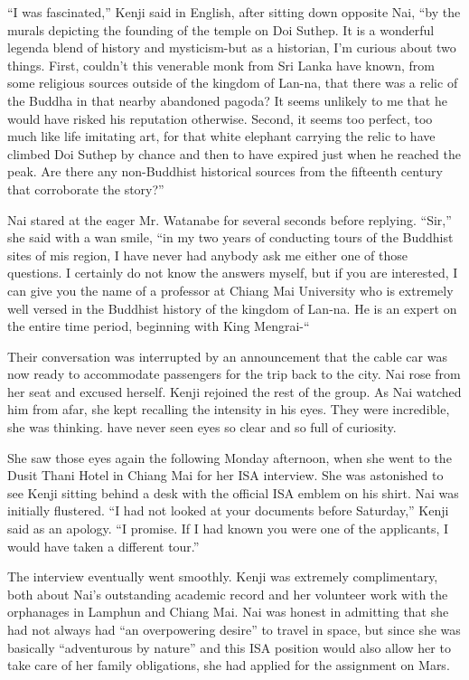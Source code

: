 \documentclass[]{article}
\begin{document}
{“I was fascinated,” Kenji said in English, after sitting down opposite Nai, “by the murals depicting the founding of the temple on Doi Suthep.  It is a wonderful legenda blend of history and mysticism-but as a historian, I’m curious about two things.  First, couldn’t this venerable monk from Sri Lanka have known, from some religious sources outside of the kingdom of Lan-na, that there was a relic of the Buddha in that nearby abandoned pagoda? It seems unlikely to me that he would have risked his reputation otherwise.  Second, it seems too perfect, too much like life imitating art, for that white elephant carrying the relic to have climbed Doi Suthep by chance and then to have expired just when he reached the peak.  Are there any non-Buddhist historical sources from the fifteenth century that corroborate the story?”

Nai stared at the eager Mr.  Watanabe for several seconds before replying.  “Sir,” she said with a wan smile, “in my two years of conducting tours of the Buddhist sites of mis region, I have never had anybody ask me either one of those questions.  I certainly do not know the answers myself, but if you are interested, I can give you the name of a professor at Chiang Mai University who is extremely well versed in the Buddhist history of the kingdom of Lan-na.  He is an expert on the entire time period, beginning with King Mengrai-“

Their conversation was interrupted by an announcement that the cable car was now ready to accommodate passengers for the trip back to the city.  Nai rose from her seat and excused herself.  Kenji rejoined the rest of the group.  As Nai watched him from afar, she kept recalling the intensity in his eyes.  They were incredible, she was thinking.  have never seen eyes so clear and so full of curiosity.

She saw those eyes again the following Monday afternoon, when she went to the Dusit Thani Hotel in Chiang Mai for her ISA interview.  She was astonished to see Kenji sitting behind a desk with the official ISA emblem on his shirt.  Nai was initially flustered.  “I had not looked at your documents before Saturday,” Kenji said as an apology.  “I promise.  If I had known you were one of the applicants, I would have taken a different tour.”

The interview eventually went smoothly.  Kenji was extremely complimentary, both about Nai’s outstanding academic record and her volunteer work with the orphanages in Lamphun and Chiang Mai.  Nai was honest in admitting that she had not always had “an overpowering desire” to travel in space, but since she was basically “adventurous by nature” and this ISA position would also allow her to take care of her family obligations, she had applied for the assignment on Mars.

}
\end{document}
